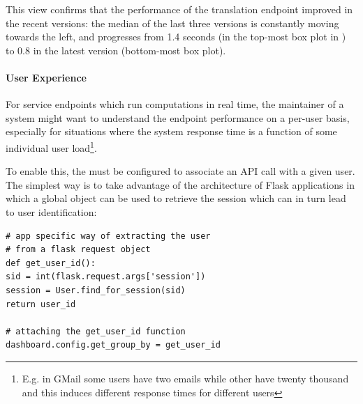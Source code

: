 \documentclass{sig-alternate-05-2015}
\begin{document}
  

  This view confirms that the performance of the translation endpoint improved in the recent versions: the median of the last three versions is constantly moving towards the left, and progresses from 1.4 seconds (in the top-most box plot in ) to 0.8 in the latest version (bottom-most box plot).
  

\paragraph{User Experience}
\label{sec:user}

For service endpoints which run computations in real time, the maintainer of a system might want to understand the endpoint performance on a per-user basis, especially for situations where the system response time is a function of some individual user load\footnote{E.g. in GMail some users have two emails while other have twenty thousand and this induces different response times for different users}.


To enable this, the \tool must be configured to associate an API call with a given user. The simplest way is to take advantage of the architecture of Flask applications in which a global  object can be used to retrieve the session which can in turn lead to user identification: 

\begin{lstlisting}[style=custompython]  
# app specific way of extracting the user
# from a flask request object    
def get_user_id():
sid = int(flask.request.args['session'])
session = User.find_for_session(sid)
return user_id

# attaching the get_user_id function
dashboard.config.get_group_by = get_user_id

\end{lstlisting}
\end{document}
